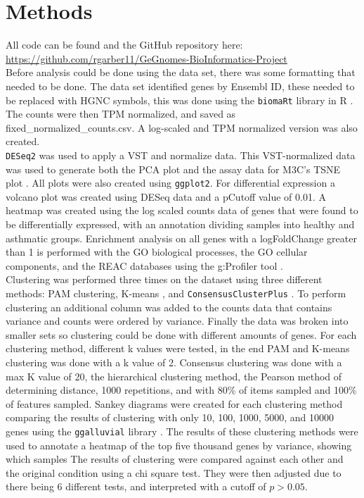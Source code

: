 \documentclass[pdflatex,sn-mathphys]{sn-jnl}%
\theoremstyle{thmstyleone}%
\theoremstyle{thmstyletwo}%
\theoremstyle{thmstylethree}%
\begin{document}
\section{Methods}\label{sec2}
All code can be found and the GitHub repository here: \href{https://github.com/rgarber11/GeGnomes-BioInformatics-Project}{https://github.com/rgarber11/GeGnomes-BioInformatics-Project} \\
Before analysis could be done using the data set, there was some formatting that needed to be done. The data set identified genes by Ensembl ID, these needed to be replaced with HGNC symbols, this was done using the \texttt{biomaRt} library in R \cite{Steffen_Durinck_biomartdevgmailcom_Wolfgang_Huber2017-mr}. The counts were then TPM normalized, and saved as fixed\_normalized\_counts.csv. A log-scaled and TPM normalized version was also created. \\
\texttt{DESeq2} was used to apply a VST and normalize data. This VST-normalized data was used to generate both the PCA plot and the assay data for M3C’s TSNE plot \cite{Love2014-fy, Zhu2019-jm,John2018-os}. All plots were also created using \texttt{ggplot2}. For differential expression a volcano plot was created using DESeq data and a pCutoff value of 0.01. A heatmap \cite{Gu2016-vz} was created using the log scaled counts data of genes that were found to be differentially expressed, with an annotation dividing samples into healthy and asthmatic groups.
Enrichment analysis on all genes with a logFoldChange greater than 1 is performed with the GO biological processes, the GO cellular components, and the REAC databases using the g:Profiler tool \cite{Raudvere2019-bp, ashburner2000gene, fabregat2018reactome}. \\
Clustering was performed three times on the dataset using three different methods: PAM clustering, K-means \cite{clusterpackage}, and \texttt{ConsensusClusterPlus} \cite{Wilkerson2010-aw}. To perform clustering an additional column was added to the counts data that contains variance and counts were ordered by variance. Finally the data was broken into smaller sets so clustering could be done with different amounts of genes. For each clustering method, different k values were tested, in the end PAM and K-means clustering was done with a k value of 2. Consensus clustering was done with a max K value of 20, the hierarchical clustering method, the Pearson method of determining distance, 1000 repetitions, and with 80\% of items sampled and 100\% of features sampled.  Sankey diagrams were created for each clustering method comparing the results of clustering with only 10, 100, 1000, 5000, and 10000 genes using the \texttt{ggalluvial} library \cite{ggalluvial-article}. The results of these clustering methods were used to annotate a heatmap \cite{Gu2016-vz} of the top five thousand genes by variance, showing which samples  The results of clustering were compared against each other and the original condition using a chi square test. They were then adjusted due to there being 6 different tests, and interpreted with a cutoff of $p > 0.05$.
\end{document}
